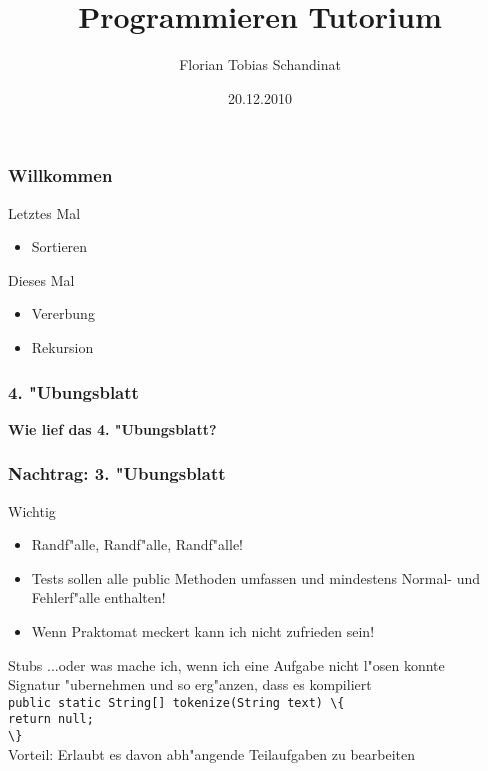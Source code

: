 \documentclass{beamer}
\title{Programmieren Tutorium}
\author{Florian Tobias Schandinat}
\date{20.12.2010}
\institute{FTS}
\begin{document}
\begin{frame}
\frametitle{Willkommen}
\pause
\begin{alertblock}{Letztes Mal}
\begin{itemize}
\item Sortieren
\end{itemize}
\end{alertblock}

\begin{block}{Dieses Mal}
\begin{itemize}
\item Vererbung
\item Rekursion
\end{itemize}
\end{block}
\end{frame}


\begin{frame}
\frametitle{4. "Ubungsblatt}
\begin{center}
\textbf{\Huge Wie lief das 4. "Ubungsblatt?}
\end{center}
\end{frame}


\begin{frame}
\frametitle{Nachtrag: 3. "Ubungsblatt}
\begin{block}{Wichtig}
\begin{itemize}
\item Randf"alle, {\LARGE Randf"alle}, \alert{\Huge Randf"alle!}
\item Tests sollen alle public Methoden umfassen und mindestens Normal- und Fehlerf"alle enthalten!
\item Wenn Praktomat meckert kann ich nicht zufrieden sein!
\end{itemize}
\end{block}

\pause

\begin{block}{Stubs}\pause
...oder was mache ich, wenn ich eine Aufgabe nicht l"osen konnte\\\pause
Signatur "ubernehmen und so erg"anzen, dass es kompiliert\\
\lstinline|public static String[] tokenize(String text) \{|\\
\hspace{2em}\lstinline|return null;|\\
\lstinline|\}|\\\pause
Vorteil: Erlaubt es davon abh"angende Teilaufgaben zu bearbeiten
\end{block}
\end{frame}
\end{document}
